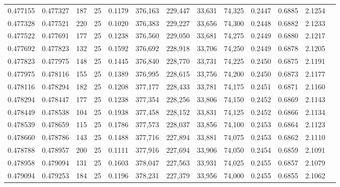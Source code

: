 \begin{tabular}{rrrrrrrrrrrrr}
0.477155 & 0.477327 &   187 &  25 &                                     0.1179 & 376,163 & 229,447 &  33,631 &  74,325 & 0.2447 & 0.6885 & 2.1254 \\
0.477328 & 0.477521 &   220 &  25 &                                     0.1020 & 376,383 & 229,227 &  33,656 &  74,300 & 0.2448 & 0.6882 & 2.1233 \\
0.477522 & 0.477691 &   177 &  25 &                                     0.1238 & 376,560 & 229,050 &  33,681 &  74,275 & 0.2449 & 0.6880 & 2.1217 \\
0.477692 & 0.477823 &   132 &  25 &                                     0.1592 & 376,692 & 228,918 &  33,706 &  74,250 & 0.2449 & 0.6878 & 2.1205 \\
0.477823 & 0.477975 &   148 &  25 &                                     0.1445 & 376,840 & 228,770 &  33,731 &  74,225 & 0.2450 & 0.6875 & 2.1191 \\
0.477975 & 0.478116 &   155 &  25 &                                     0.1389 & 376,995 & 228,615 &  33,756 &  74,200 & 0.2450 & 0.6873 & 2.1177 \\
0.478116 & 0.478294 &   182 &  25 &                                     0.1208 & 377,177 & 228,433 &  33,781 &  74,175 & 0.2451 & 0.6871 & 2.1160 \\
0.478294 & 0.478447 &   177 &  25 &                                     0.1238 & 377,354 & 228,256 &  33,806 &  74,150 & 0.2452 & 0.6869 & 2.1143 \\
0.478449 & 0.478538 &   104 &  25 &                                     0.1938 & 377,458 & 228,152 &  33,831 &  74,125 & 0.2452 & 0.6866 & 2.1134 \\
0.478539 & 0.478659 &   115 &  25 &                                     0.1786 & 377,573 & 228,037 &  33,856 &  74,100 & 0.2453 & 0.6864 & 2.1123 \\
0.478660 & 0.478786 &   143 &  25 &                                     0.1488 & 377,716 & 227,894 &  33,881 &  74,075 & 0.2453 & 0.6862 & 2.1110 \\
0.478788 & 0.478957 &   200 &  25 &                                     0.1111 & 377,916 & 227,694 &  33,906 &  74,050 & 0.2454 & 0.6859 & 2.1091 \\
0.478958 & 0.479094 &   131 &  25 &                                     0.1603 & 378,047 & 227,563 &  33,931 &  74,025 & 0.2455 & 0.6857 & 2.1079 \\
0.479094 & 0.479253 &   184 &  25 &                                     0.1196 & 378,231 & 227,379 &  33,956 &  74,000 & 0.2455 & 0.6855 & 2.1062 \\

\end{tabular}
